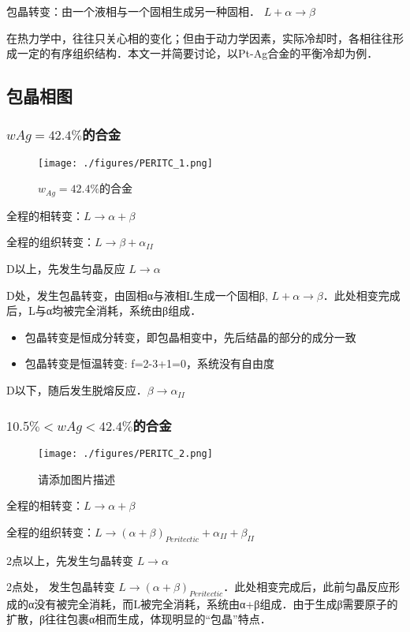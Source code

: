 包晶转变：由一个液相与一个固相生成另一种固相． $L + \alpha \rightarrow \beta$

在热力学中，往往只关心相的变化；但由于动力学因素，实际冷却时，各相往往形成一定的有序组织结构．本文一并简要讨论，以Pt-Ag合金的平衡冷却为例．

\subsection{包晶相图}
\subsubsection{$wAg=42.4\%$的合金} 

\begin{figure}[ht]
\centering
\texttt{[image: ./figures/PERITC\_1.png]}
\caption{$w_{Ag}=42.4\%$的合金} \label{PERITC_fig1}
\end{figure}

全程的相转变：$L \rightarrow \alpha+\beta$

全程的组织转变：$L \rightarrow \beta + \alpha_{II}$

D以上，先发生匀晶反应 $L \rightarrow \alpha$

D处，发生包晶转变，由固相α与液相L生成一个固相β, $L + \alpha \rightarrow \beta$．此处相变完成后，L与α均被完全消耗，系统由β组成．
\begin{itemize}
\item 包晶转变是恒成分转变，即包晶相变中，先后结晶的部分的成分一致
\item 包晶转变是恒温转变: f=2-3+1=0，系统没有自由度
\end{itemize}
D以下，随后发生脱熔反应．$\beta \rightarrow \alpha_{II}$

\subsubsection{$10.5\%<wAg<42.4\%$的合金} 
\begin{figure}[ht]
\centering
\texttt{[image: ./figures/PERITC\_2.png]}
\caption{请添加图片描述} \label{PERITC_fig2}
\end{figure}

全程的相转变：$L \rightarrow \alpha+\beta$

全程的组织转变：$L \rightarrow (\alpha+\beta)_{Peritectic} + \alpha_{II} + \beta_{II}$

2点以上，先发生匀晶转变 $L \rightarrow \alpha$

2点处， 发生包晶转变 $L \rightarrow (\alpha+\beta)_{Peritectic}$．此处相变完成后，此前匀晶反应形成的α没有被完全消耗，而L被完全消耗，系统由α+β组成．由于生成β需要原子的扩散，β往往包裹α相而生成，体现明显的“包晶”特点．

